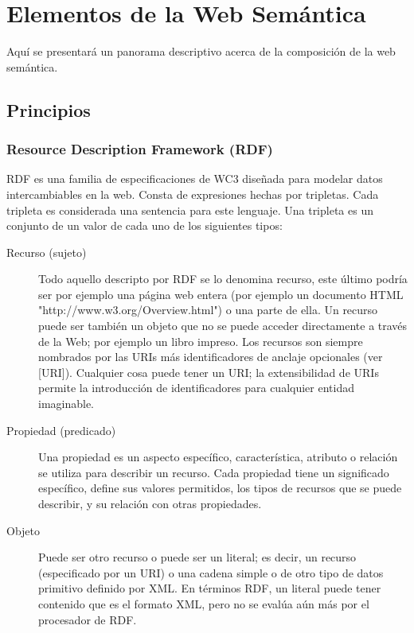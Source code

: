 \chapter{Elementos de la Web Semántica}
\label{chapter:semanticwebelements}

Aquí se presentará un panorama descriptivo acerca de la composición de la web semántica.

\section{Principios}

\subsection{Resource Description Framework (RDF)}

RDF \cite{Cyganiak2013} es una familia de especificaciones de WC3 diseñada para modelar datos intercambiables en la web. 
Consta de expresiones hechas por tripletas. Cada tripleta es considerada una sentencia para este lenguaje.
Una tripleta es un conjunto de un valor de cada uno de los siguientes tipos:

\begin{description}
 \item[Recurso (sujeto)] Todo aquello descripto por RDF se lo denomina recurso, este último podría ser por ejemplo una página web entera (por ejemplo 
un documento HTML "http://www.w3.org/Overview.html") o una parte de ella.  Un recurso puede ser también un objeto que no 
se puede acceder directamente a través de la Web; por ejemplo un libro impreso. Los recursos son siempre nombrados por las 
URIs más identificadores de anclaje opcionales (ver [URI]). Cualquier cosa puede tener un URI; la extensibilidad de URIs 
permite la introducción de identificadores para cualquier entidad imaginable.
 \item[Propiedad (predicado)] Una propiedad es un aspecto específico, característica, atributo o relación se utiliza para describir un recurso. 
Cada propiedad tiene un significado específico, define sus valores permitidos, los tipos de recursos que se puede describir, 
y su relación con otras propiedades. 
 \item[Objeto] Puede ser otro recurso o puede ser un literal; es decir, un recurso (especificado por un URI) o una cadena simple o 
de otro tipo de datos primitivo definido por XML. En términos RDF, un literal puede tener contenido que es el formato XML,
pero no se evalúa aún más por el procesador de RDF.
\end{description}


